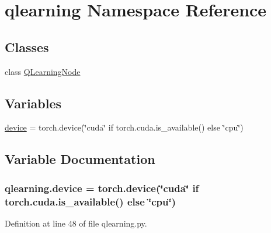 \hypertarget{namespaceqlearning}{}\section{qlearning Namespace Reference}
\label{namespaceqlearning}
\subsection*{Classes}
\begin{DoxyCompactItemize}
\item 
class \hyperlink{classqlearning_1_1_q_learning_node}{Q\+Learning\+Node}
\end{DoxyCompactItemize}
\subsection*{Variables}
\begin{DoxyCompactItemize}
\item 
\hyperlink{namespaceqlearning_a6034910e71ae6db3114fb7b830d3e45d}{device} = torch.\+device(\char`\"{}cuda\char`\"{} if torch.\+cuda.\+is\+\_\+available() else \char`\"{}cpu\char`\"{})
\end{DoxyCompactItemize}


\subsection{Variable Documentation}
\subsubsection[{\texorpdfstring{device}{device}}]{\setlength{\rightskip}{0pt plus 5cm}qlearning.\+device = torch.\+device(\char`\"{}cuda\char`\"{} if torch.\+cuda.\+is\+\_\+available() else \char`\"{}cpu\char`\"{})}\hypertarget{namespaceqlearning_a6034910e71ae6db3114fb7b830d3e45d}{}\label{namespaceqlearning_a6034910e71ae6db3114fb7b830d3e45d}


Definition at line 48 of file qlearning.\+py.

